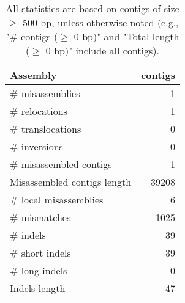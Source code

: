 \documentclass[12pt,a4paper]{article}
\begin{document}
\begin{table}[ht]
\begin{center}
\caption{All statistics are based on contigs of size $\geq$ 500 bp, unless otherwise noted (e.g., "\# contigs ($\geq$ 0 bp)" and "Total length ($\geq$ 0 bp)" include all contigs).}
\begin{tabular}{|l*{1}{|r}|}
\hline
Assembly & contigs \\ \hline
\# misassemblies & 1 \\ \hline
\hspace{5mm}\# relocations & 1 \\ \hline
\hspace{5mm}\# translocations & 0 \\ \hline
\hspace{5mm}\# inversions & 0 \\ \hline
\# misassembled contigs & 1 \\ \hline
Misassembled contigs length & 39208 \\ \hline
\# local misassemblies & 6 \\ \hline
\# mismatches & 1025 \\ \hline
\# indels & 39 \\ \hline
\hspace{5mm}\# short indels & 39 \\ \hline
\hspace{5mm}\# long indels & 0 \\ \hline
Indels length & 47 \\ \hline
\end{tabular}
\end{center}
\end{table}
\end{document}
